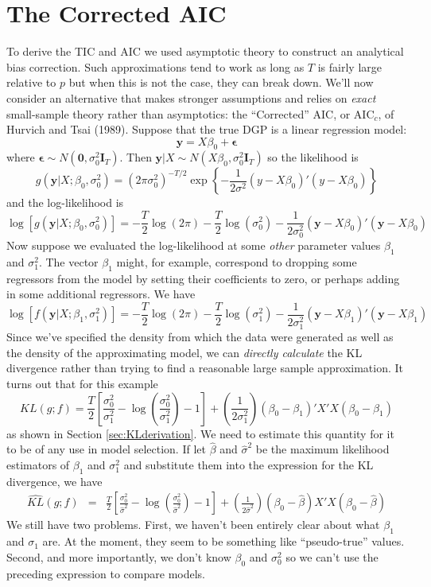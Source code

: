 \section{The Corrected AIC}
To derive the TIC and AIC we used asymptotic theory to construct an analytical bias correction. Such approximations tend to work as long as $T$ is fairly large relative to $p$ but when this is not the case, they can break down. 
We'll now consider an alternative that makes stronger assumptions and relies on \emph{exact} small-sample theory rather than asymptotics: the ``Corrected'' AIC, or AIC$_c$, of Hurvich and Tsai (1989).
Suppose that the true DGP is a linear regression model:
$$\textbf{y} = X\beta_0 + \boldsymbol{\epsilon}$$
where $\mathbf{\epsilon} \sim N(\mathbf{0}, \sigma_0^2 \mathbf{I}_T)$. 
Then $\mathbf{y}|X \sim N(X\beta_0, \sigma_0^2 \mathbf{I}_T)$ so the likelihood is
$$g(\textbf{y}|X;\beta_0, \sigma^2_0) = \left(2\pi\sigma_0^2\right)^{-T/2} \exp\left\{ -\frac{1}{2\sigma^2}(y - X\beta_0)'(y - X\beta_0)\right\}$$
and the log-likelihood is
$$\log\left[g(\textbf{y}|X;\beta_0, \sigma_0^2)\right] = -\frac{T}{2}\log(2\pi) -\frac{T}{2} \log(\sigma^2_0) - \frac{1}{2\sigma_0^2}\left(\textbf{y} - X\beta_0\right)'\left(\textbf{y} -X\beta_0\right)$$
Now suppose we evaluated the log-likelihood at some \emph{other} parameter values $\beta_1$ and $\sigma^2_1$. The vector $\beta_1$ might, for example, correspond to dropping some regressors from the model by setting their coefficients to zero, or perhaps adding in some additional regressors. 
We have
$$\log[f(\textbf{y}|X;\beta_1, \sigma_1^2)] = -\frac{T}{2}\log(2\pi) -\frac{T}{2} \log(\sigma^2_1) - \frac{1}{2\sigma_1^2}\left(\textbf{y} - X\beta_1\right)'\left(\textbf{y} -X\beta_1\right)$$
Since we've specified the density from which the data were generated as well as the density of the approximating model, we can \emph{directly calculate} the KL divergence rather than trying to find a reasonable large sample approximation. It turns out that for this example 
$$KL(g;f) = \frac{T}{2}\left[\frac{\sigma_0^2}{\sigma_1^2} - \log\left(\frac{\sigma_0^2}{\sigma_1^2}\right) - 1 \right] + \left(\frac{1}{2 \sigma_1^2}\right)\left(\beta_0 - \beta_1\right)'X'X\left(\beta_0 - \beta_1\right)$$ 
as shown in Section \ref{sec:KLderivation}.
We need to estimate this quantity for it to be of any use in model selection. If let $\widehat{\beta}$ and $\widehat{\sigma}^2$ be the maximum likelihood estimators of $\beta_1$ and $\sigma_1^2$ and substitute them into the expression for the KL divergence, we have
\begin{eqnarray*}
\widehat{KL}(g;f) &=& \frac{T}{2}\left[\frac{\sigma_0^2}{\widehat{\sigma}^2} - \log\left(\frac{\sigma_0^2}{\widehat{\sigma}^2} \right) - 1\right] + \left(\frac{1}{2\widehat{\sigma}^2} \right)\left(\beta_0 - \widehat{\beta}\right)X'X\left(\beta_0 - \widehat{\beta}\right)
\end{eqnarray*}
We still have two problems. First, we haven't been entirely clear about what $\beta_1$ and $\sigma_1$ are. At the moment, they seem to be something like ``pseudo-true'' values. Second, and more importantly, we don't know $\beta_0$ and $\sigma_0^2$ so we can't use the preceding expression to compare models.

